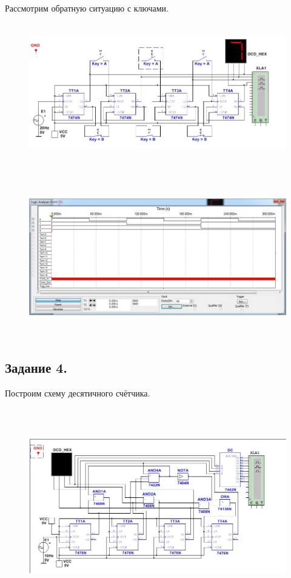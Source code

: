 \documentclass[spec, och, labwork]{shiza}
\begin{document}
Рассмотрим обратную ситуацию с ключами.

\begin{figure}[H]
    \centering
    \includegraphics[width=5.56762in,height=2.41667in]{image11.jpeg}
\end{figure}

\begin{figure}[H]
    \centering
    \includegraphics[width=6.19767in,height=2.80303in]{image10.jpeg}
\end{figure}


\subsection*{Задание 4.}

Построим схему десятичного счётчика.

\begin{figure}[H]
    \centering
    \includegraphics[width=6.45829in,height=3.3613in]{image12.jpeg}
\end{figure}
\end{document}
